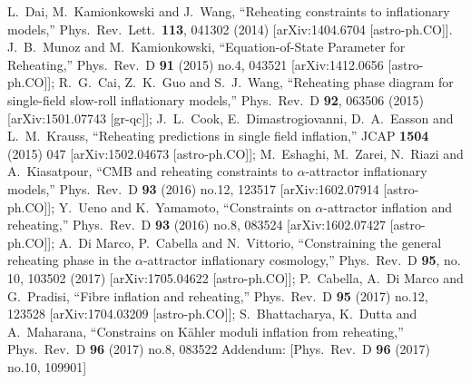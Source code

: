 \documentclass[%
aps,prd,nofootinbib,showkeys,a4paper,10pt
]{revtex4-2}
\begin{document}
\begin{thebibliography}{10}
L.~Dai, M.~Kamionkowski and J.~Wang,
``Reheating constraints to inflationary models,''
Phys.\ Rev.\ Lett.\  {\bf 113}, 041302 (2014)
[arXiv:1404.6704 [astro-ph.CO]].
J.~B.~Munoz and M.~Kamionkowski,
``Equation-of-State Parameter for Reheating,''
Phys.\ Rev.\ D {\bf 91} (2015) no.4,  043521
[arXiv:1412.0656 [astro-ph.CO]];
R.~G.~Cai, Z.~K.~Guo and S.~J.~Wang,
``Reheating phase diagram for single-field slow-roll inflationary models,''
Phys.\ Rev.\ D {\bf 92}, 063506 (2015)
[arXiv:1501.07743 [gr-qc]];
J.~L.~Cook, E.~Dimastrogiovanni, D.~A.~Easson and L.~M.~Krauss,
``Reheating predictions in single field inflation,''
JCAP {\bf 1504} (2015) 047
[arXiv:1502.04673 [astro-ph.CO]];
M.~Eshaghi, M.~Zarei, N.~Riazi and A.~Kiasatpour,
``CMB and reheating constraints to $\alpha$-attractor inflationary models,''
Phys.\ Rev.\ D {\bf 93} (2016) no.12,  123517
[arXiv:1602.07914 [astro-ph.CO]];
Y.~Ueno and K.~Yamamoto,
``Constraints on $\alpha$-attractor inflation and reheating,''
Phys.\ Rev.\ D {\bf 93} (2016) no.8,  083524
[arXiv:1602.07427 [astro-ph.CO]];
A.~Di Marco, P.~Cabella and N.~Vittorio,
``Constraining the general reheating phase in the $\alpha$-attractor inflationary cosmology,''
Phys.\ Rev.\ D {\bf 95}, no. 10, 103502 (2017)
[arXiv:1705.04622 [astro-ph.CO]];
P.~Cabella, A.~Di Marco and G.~Pradisi,
``Fibre inflation and reheating,''
Phys.\ Rev.\ D {\bf 95} (2017) no.12,  123528
[arXiv:1704.03209 [astro-ph.CO]];
S.~Bhattacharya, K.~Dutta and A.~Maharana,
``Constrains on Kähler moduli inflation from reheating,''
Phys.\ Rev.\ D {\bf 96} (2017) no.8,  083522
Addendum: [Phys.\ Rev.\ D {\bf 96} (2017) no.10,  109901]

\end{thebibliography}
\end{document}
